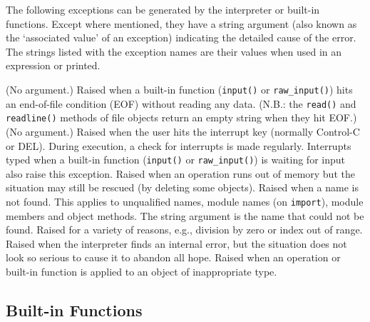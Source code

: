 The following exceptions can be generated by the interpreter or
built-in functions.
Except where mentioned, they have a string argument (also known as the
`associated value' of an exception) indicating the detailed cause of the
error.
The strings listed with the exception names are their values when used
in an expression or printed.
\begin{description}
(No argument.)
Raised when a built-in function ({\tt input()} or {\tt raw\_input()})
hits an end-of-file condition (EOF) without reading any data.
(N.B.: the {\tt read()} and {\tt readline()} methods of file objects
return an empty string when they hit EOF.)
(No argument.)
Raised when the user hits the interrupt key (normally Control-C or DEL).
During execution, a check for interrupts is made regularly.
Interrupts typed when a built-in function ({\tt input()} or
{\tt raw\_input()}) is waiting for input also raise this exception.
Raised when an operation runs out of memory but the situation
may still be rescued (by deleting some objects).
Raised when a name is not found.
This applies to unqualified names, module names (on {\tt import}),
module members and object methods.
The string argument is the name that could not be found.
Raised for a variety of reasons, e.g., division by zero or index out of
range.
Raised when the interpreter finds an internal error, but the situation
does not look so serious to cause it to abandon all hope.
Raised when an operation or built-in function is applied to an object of
inappropriate type.
\end{description}

\subsection{Built-in Functions}

